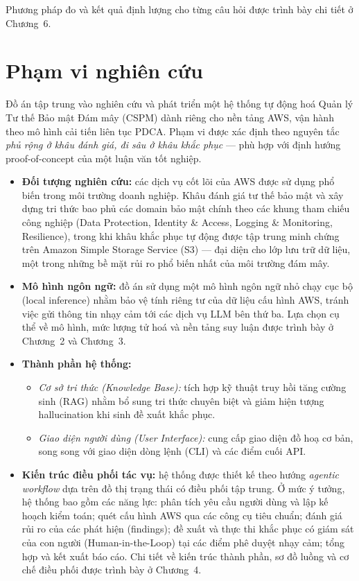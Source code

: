 Phương pháp đo và kết quả định lượng cho từng câu hỏi được trình bày chi tiết ở Chương~6.


\section{Phạm vi nghiên cứu}
\label{sec:scope}

Đồ án tập trung vào nghiên cứu và phát triển một hệ thống tự động hoá Quản lý Tư thế Bảo mật Đám mây (CSPM) dành riêng cho nền tảng AWS, vận hành theo mô hình cải tiến liên tục PDCA. Phạm vi được xác định theo nguyên tắc \textit{phủ rộng ở khâu đánh giá, đi sâu ở khâu khắc phục} — phù hợp với định hướng proof-of-concept của một luận văn tốt nghiệp.

\begin{itemize}
    \item \textbf{Đối tượng nghiên cứu:} các dịch vụ cốt lõi của AWS được sử dụng phổ biến trong môi trường doanh nghiệp. Khâu đánh giá tư thế bảo mật và xây dựng tri thức bao phủ các domain bảo mật chính theo các khung tham chiếu công nghiệp (Data Protection, Identity \& Access, Logging \& Monitoring, Resilience), trong khi khâu khắc phục tự động được tập trung minh chứng trên Amazon Simple Storage Service (S3) — đại diện cho lớp lưu trữ dữ liệu, một trong những bề mặt rủi ro phổ biến nhất của môi trường đám mây.

    \item \textbf{Mô hình ngôn ngữ:} đồ án sử dụng một mô hình ngôn ngữ nhỏ chạy cục bộ (local inference) nhằm bảo vệ tính riêng tư của dữ liệu cấu hình AWS, tránh việc gửi thông tin nhạy cảm tới các dịch vụ LLM bên thứ ba. Lựa chọn cụ thể về mô hình, mức lượng tử hoá và nền tảng suy luận được trình bày ở Chương~2 và Chương~3.

    \item \textbf{Thành phần hệ thống:}
    \begin{itemize}
        \item \textit{Cơ sở tri thức (Knowledge Base):} tích hợp kỹ thuật truy hồi tăng cường sinh (RAG) nhằm bổ sung tri thức chuyên biệt và giảm hiện tượng hallucination khi sinh đề xuất khắc phục.
        \item \textit{Giao diện người dùng (User Interface):} cung cấp giao diện đồ hoạ cơ bản, song song với giao diện dòng lệnh (CLI) và các điểm cuối API.
    \end{itemize}

    \item \textbf{Kiến trúc điều phối tác vụ:} hệ thống được thiết kế theo hướng \textit{agentic workflow} dựa trên đồ thị trạng thái có điều phối tập trung. Ở mức ý tưởng, hệ thống bao gồm các năng lực: phân tích yêu cầu người dùng và lập kế hoạch kiểm toán; quét cấu hình AWS qua các công cụ tiêu chuẩn; đánh giá rủi ro của các phát hiện (findings); đề xuất và thực thi khắc phục có giám sát của con người (Human-in-the-Loop) tại các điểm phê duyệt nhạy cảm; tổng hợp và kết xuất báo cáo. Chi tiết về kiến trúc thành phần, sơ đồ luồng và cơ chế điều phối được trình bày ở Chương~4.


\end{itemize}
